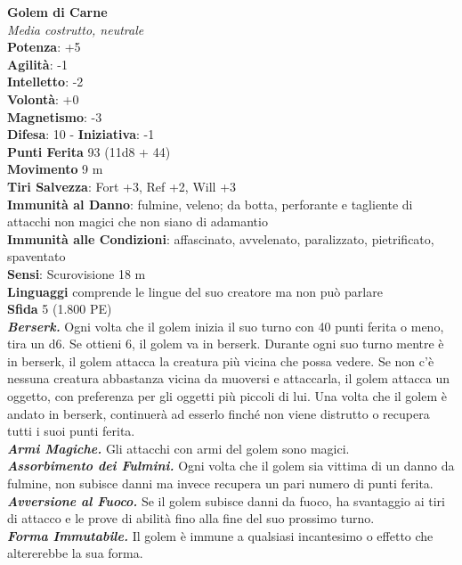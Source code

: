 \begin{multicols}{2}
\medskip\textbf{Golem di Carne}\\
\emph{Media costrutto, neutrale}\\
\textbf{Potenza}: +5\\
\textbf{Agilità}: -1\\
\textbf{Intelletto}: -2\\
\textbf{Volontà}: +0\\
\textbf{Magnetismo}: -3\\
\textbf{Difesa}: 10 - \textbf{Iniziativa}: -1\\
\textbf{Punti Ferita} 93 (11d8 + 44)\\
\textbf{Movimento} 9 m\\
\textbf{Tiri Salvezza}: Fort +3, Ref +2, Will +3\\
\textbf{Immunità al Danno}: fulmine, veleno; da botta, perforante e tagliente di attacchi non magici che non siano di adamantio\\
\textbf{Immunità alle Condizioni}: affascinato, avvelenato, paralizzato, pietrificato, spaventato\\
\textbf{Sensi}: Scurovisione 18 m\\
\textbf{Linguaggi} comprende le lingue del suo creatore ma non può parlare\\
\textbf{Sfida} 5 (1.800 PE)\smallskip\\
\emph{\textbf{Berserk.}} Ogni volta che il golem inizia il suo turno con 40 punti ferita o meno, tira un d6. Se ottieni 6, il golem va in berserk. Durante ogni suo turno mentre è in berserk, il golem attacca la creatura più vicina che possa vedere. Se non c'è nessuna creatura abbastanza vicina da muoversi e attaccarla, il golem attacca un oggetto, con preferenza per gli oggetti più piccoli di lui. Una volta che il golem è andato in berserk, continuerà ad esserlo finché non viene distrutto o recupera tutti i suoi punti ferita.\\
\emph{\textbf{Armi Magiche.}} Gli attacchi con armi del golem sono magici.\\
\emph{\textbf{Assorbimento dei Fulmini.}} Ogni volta che il golem sia vittima di un danno da fulmine, non subisce danni ma invece recupera un pari numero di punti ferita.\\
\emph{\textbf{Avversione al Fuoco.}} Se il golem subisce danni da fuoco, ha svantaggio ai tiri di attacco e le prove di abilità fino alla fine del suo prossimo turno.\\
\emph{\textbf{Forma Immutabile.}} Il golem è immune a qualsiasi incantesimo o effetto che altererebbe la sua forma.\\

\end{multicols}

